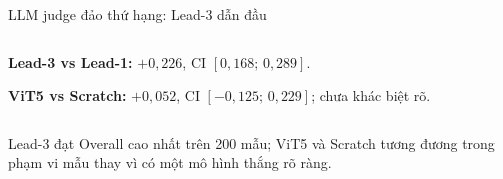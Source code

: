 \documentclass[aspectratio=169,10pt]{beamer}
\begin{document}
\begin{frame}{LLM judge đảo thứ hạng: Lead-3 dẫn đầu}
\begin{columns}[T,onlytextwidth]
      \vspace{1.2mm}
      \begin{softbox}
        \RaggedRight\scriptsize
        \textbf{Lead-3 vs Lead-1:} $+0{,}226$, CI $[0{,}168;\,0{,}289]$.\par
        \vspace{0.8mm}
        \textbf{ViT5 vs Scratch:} $+0{,}052$, CI $[-0{,}125;\,0{,}229]$; chưa khác biệt rõ.
      \end{softbox}
  \end{columns}

  \vspace{0.7mm}
  \begin{keymessage}
    \scriptsize Lead-3 đạt Overall cao nhất trên 200 mẫu; ViT5 và Scratch tương đương trong phạm vi mẫu thay vì có một mô hình thắng rõ ràng.
  \end{keymessage}
\end{frame}
\end{document}
